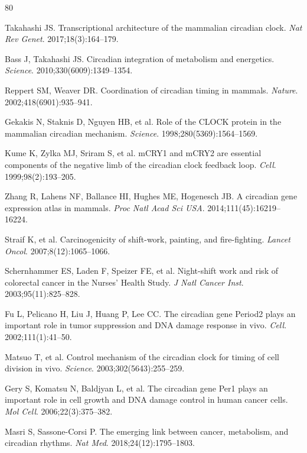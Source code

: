 \documentclass[11pt,a4paper]{article}
\begin{document}

\begin{thebibliography}{80}

Takahashi JS. Transcriptional architecture of the mammalian circadian clock. \textit{Nat Rev Genet}. 2017;18(3):164--179.

Bass J, Takahashi JS. Circadian integration of metabolism and energetics. \textit{Science}. 2010;330(6009):1349--1354.

Reppert SM, Weaver DR. Coordination of circadian timing in mammals. \textit{Nature}. 2002;418(6901):935--941.

Gekakis N, Staknis D, Nguyen HB, et al. Role of the CLOCK protein in the mammalian circadian mechanism. \textit{Science}. 1998;280(5369):1564--1569.

Kume K, Zylka MJ, Sriram S, et al. mCRY1 and mCRY2 are essential components of the negative limb of the circadian clock feedback loop. \textit{Cell}. 1999;98(2):193--205.

Zhang R, Lahens NF, Ballance HI, Hughes ME, Hogenesch JB. A circadian gene expression atlas in mammals. \textit{Proc Natl Acad Sci USA}. 2014;111(45):16219--16224.

Straif K, et al. Carcinogenicity of shift-work, painting, and fire-fighting. \textit{Lancet Oncol}. 2007;8(12):1065--1066.

Schernhammer ES, Laden F, Speizer FE, et al. Night-shift work and risk of colorectal cancer in the Nurses' Health Study. \textit{J Natl Cancer Inst}. 2003;95(11):825--828.

Fu L, Pelicano H, Liu J, Huang P, Lee CC. The circadian gene Period2 plays an important role in tumor suppression and DNA damage response in vivo. \textit{Cell}. 2002;111(1):41--50.

Matsuo T, et al. Control mechanism of the circadian clock for timing of cell division in vivo. \textit{Science}. 2003;302(5643):255--259.

Gery S, Komatsu N, Baldjyan L, et al. The circadian gene Per1 plays an important role in cell growth and DNA damage control in human cancer cells. \textit{Mol Cell}. 2006;22(3):375--382.

Masri S, Sassone-Corsi P. The emerging link between cancer, metabolism, and circadian rhythms. \textit{Nat Med}. 2018;24(12):1795--1803.


\end{thebibliography}
\end{document}
